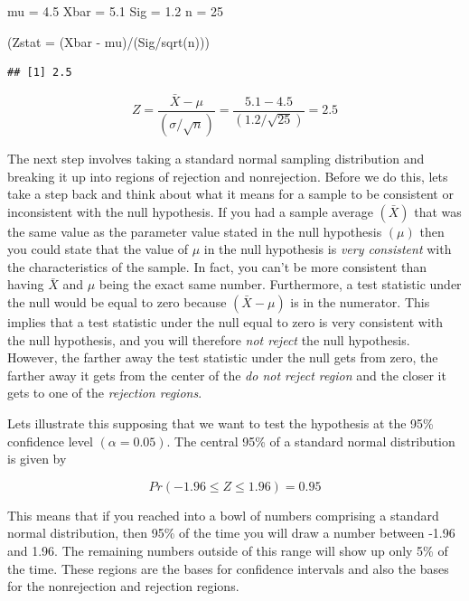 \documentclass[
]{book}
\newenvironment{Shaded}{\begin{snugshade}}{\end{snugshade}}
\newcommand{\AttributeTok}[1]{\textcolor[rgb]{0.77,0.63,0.00}{#1}}
\newcommand{\DecValTok}[1]{\textcolor[rgb]{0.00,0.00,0.81}{#1}}
\newcommand{\FloatTok}[1]{\textcolor[rgb]{0.00,0.00,0.81}{#1}}
\newcommand{\FunctionTok}[1]{\textcolor[rgb]{0.00,0.00,0.00}{#1}}
\newcommand{\NormalTok}[1]{#1}
\newcommand{\OtherTok}[1]{\textcolor[rgb]{0.56,0.35,0.01}{#1}}
\newcommand{\SpecialCharTok}[1]{\textcolor[rgb]{0.00,0.00,0.00}{#1}}
\begin{document}
\begin{Shaded}
\begin{Highlighting}[]
\NormalTok{mu }\OtherTok{=} \FloatTok{4.5}
\NormalTok{Xbar }\OtherTok{=} \FloatTok{5.1}
\NormalTok{Sig }\OtherTok{=} \FloatTok{1.2}
\NormalTok{n }\OtherTok{=} \DecValTok{25}

\NormalTok{(}\AttributeTok{Zstat =}\NormalTok{ (Xbar }\SpecialCharTok{{-}}\NormalTok{ mu)}\SpecialCharTok{/}\NormalTok{(Sig}\SpecialCharTok{/}\FunctionTok{sqrt}\NormalTok{(n)))}
\end{Highlighting}
\end{Shaded}

\begin{verbatim}
## [1] 2.5
\end{verbatim}

\[ Z = \frac{\bar{X}-\mu}{\left(\sigma / \sqrt{n} \right)} = \frac{5.1-4.5}{\left(1.2 / \sqrt{25} \right)} = 2.5\]

The next step involves taking a standard normal sampling distribution and breaking it up into regions of rejection and nonrejection. Before we do this, lets take a step back and think about what it means for a sample to be consistent or inconsistent with the null hypothesis. If you had a sample average \((\bar{X})\) that was the same value as the parameter value stated in the null hypothesis \((\mu)\) then you could state that the value of \(\mu\) in the null hypothesis is \emph{very consistent} with the characteristics of the sample. In fact, you can't be more consistent than having \(\bar{X}\) and \(\mu\) being the exact same number. Furthermore, a test statistic under the null would be equal to zero because \((\bar{X}-\mu)\) is in the numerator. This implies that a test statistic under the null equal to zero is very consistent with the null hypothesis, and you will therefore \emph{not reject} the null hypothesis. However, the farther away the test statistic under the null gets from zero, the farther away it gets from the center of the \emph{do not reject region} and the closer it gets to one of the \emph{rejection regions}.

Lets illustrate this supposing that we want to test the hypothesis at the 95\% confidence level \((\alpha=0.05)\). The central 95\% of a standard normal distribution is given by

\[Pr(-1.96 \leq Z \leq 1.96) = 0.95\]

This means that if you reached into a bowl of numbers comprising a standard normal distribution, then 95\% of the time you will draw a number between -1.96 and 1.96. The remaining numbers outside of this range will show up only 5\% of the time. These regions are the bases for confidence intervals and also the bases for the nonrejection and rejection regions.
\end{document}
